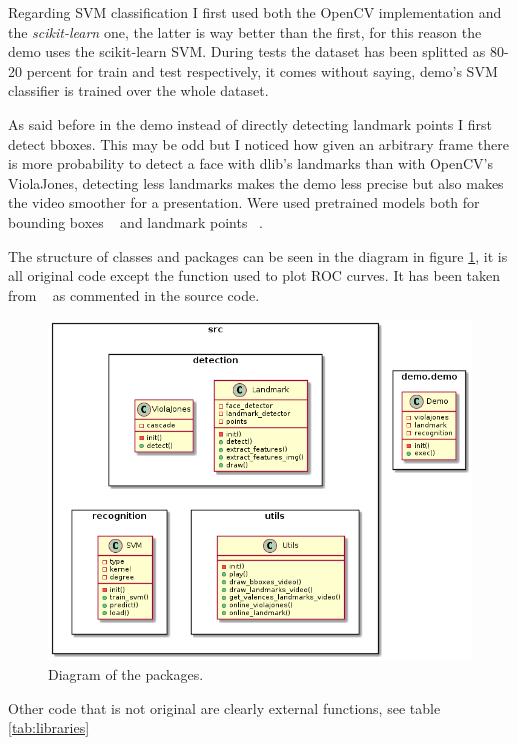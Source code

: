 Regarding SVM classification I first used both the OpenCV implementation and the \textit{scikit-learn} one, the latter is way better than the first, for this reason the demo uses the scikit-learn SVM.
During tests the dataset has been splitted as 80-20 percent for train and test respectively, it comes without saying, demo's SVM classifier is trained over the whole dataset.  

As said before in the demo instead of directly detecting landmark points I first detect bboxes. 
This may be odd but I noticed how given an arbitrary frame there is more probability to detect a face with dlib's landmarks than with OpenCV's ViolaJones, detecting less landmarks makes the demo less precise but also makes the video smoother for a presentation.
Were used pretrained models both for bounding boxes ~\cite{dataset:haar} and landmark points ~\cite{dataset:landmark}.

The structure of classes and packages can be seen in the diagram in figure \ref{fig:packages_diagram}, it is all original code except the function  used to plot ROC curves. It has been taken from ~\cite{roc} as commented in the source code.

\begin{figure}[h!t]
    \centering
    \includegraphics[scale=0.49]{../../diagrams/out/classes/classes.png}
    \caption{Diagram of the packages.}
    \label{fig:packages_diagram}
\end{figure}

Other code that is not original are clearly external functions, see table \ref{tab:libraries}

